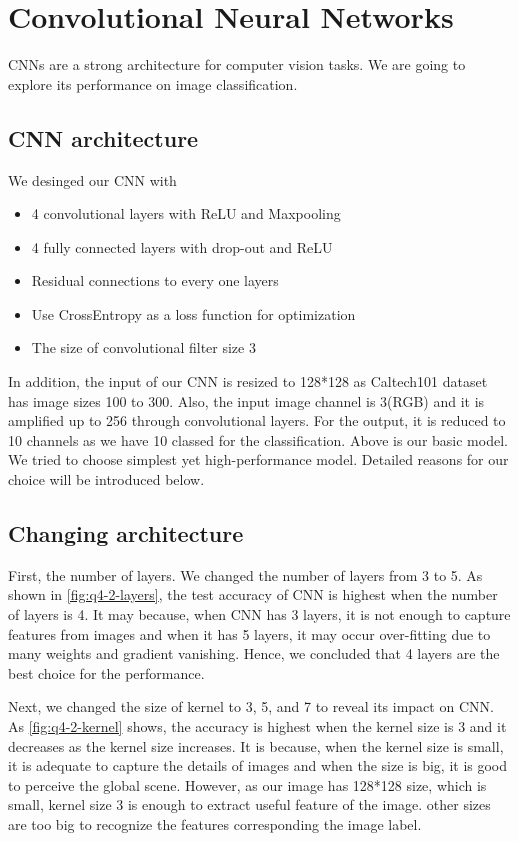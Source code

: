 \section{Convolutional Neural Networks}
\label{sec:intro}

CNNs are a strong architecture for computer vision tasks. We are going to explore its performance on image classification.

\subsection{CNN architecture}
We desinged our CNN with
\begin{itemize}
	\item 4 convolutional layers with ReLU and Maxpooling
	\item 4 fully connected layers with drop-out and ReLU
	\item Residual connections to every one layers
	\item Use CrossEntropy as a loss function for optimization
	\item The size of convolutional filter size 3
\end{itemize}
In addition, the input of our CNN is resized to 128*128 as Caltech101 dataset has image sizes 100 to 300.
Also, the input image channel is 3(RGB) and it is amplified up to 256 through convolutional layers. For the output, it is reduced to 10 channels as we have 10 classed for the classification.
Above is our basic model. We tried to choose simplest yet high-performance model. Detailed reasons for our choice will be introduced below.

\subsection{Changing architecture}
First, the number of layers. We changed the number of layers from 3 to 5. As shown in \cref{fig:q4-2-layers}, the test accuracy of CNN is highest when the number of layers is 4. It may because, when CNN has 3 layers, it is not enough to capture features from images and when it has 5 layers, it may occur over-fitting due to many weights and gradient vanishing. Hence, we concluded that 4 layers are the best choice for the performance.

Next, we changed the size of kernel to 3, 5, and 7 to reveal its impact on CNN. As \cref{fig:q4-2-kernel} shows, the accuracy is highest when the kernel size is 3 and it decreases as the kernel size increases. It is because, when the kernel size is small, it is adequate to capture the details of images and when the size is big, it is good to perceive the global scene. However, as our image has 128*128 size, which is small, kernel size 3 is enough to extract useful feature of the image. other sizes are too big to recognize the features corresponding the image label.

